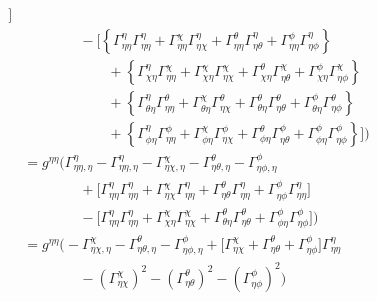 \documentclass[../main.tex]{subfiles}
\begin{document}
\begin{subequations}
\begin{align}
\begin{split}
            \Big] \\
            &\qquad\qquad - \Big[ \left\{ \Gamma^\eta_{\eta\eta} \Gamma^\eta_{\eta \eta} + \Gamma^\chi_{\eta\eta} \Gamma^\eta_{\eta \chi} + \Gamma^\theta_{\eta\eta} \Gamma^\eta_{\eta \theta} + \Gamma^\phi_{\eta\eta} \Gamma^\eta_{\eta \phi} \right\} \\
                &\qquad\qquad\qquad + \left\{ \Gamma^\eta_{\chi\eta} \Gamma^\chi_{\eta \eta} + \Gamma^\chi_{\chi\eta} \Gamma^\chi_{\eta \chi} + \Gamma^\theta_{\chi\eta} \Gamma^\chi_{\eta \theta} + \Gamma^\phi_{\chi\eta} \Gamma^\chi_{\eta \phi} \right\} \\
                &\qquad\qquad\qquad + \left\{ \Gamma^\eta_{\theta\eta} \Gamma^\theta_{\eta \eta} + \Gamma^\chi_{\theta\eta} \Gamma^\theta_{\eta \chi} + \Gamma^\theta_{\theta\eta} \Gamma^\theta_{\eta \theta} + \Gamma^\phi_{\theta\eta} \Gamma^\theta_{\eta \phi} \right\} \\
                &\qquad\qquad\qquad + \left\{ \Gamma^\eta_{\phi\eta} \Gamma^\phi_{\eta \eta} + \Gamma^\chi_{\phi\eta} \Gamma^\phi_{\eta \chi} + \Gamma^\theta_{\phi\eta} \Gamma^\phi_{\eta \theta} + \Gamma^\phi_{\phi\eta} \Gamma^\phi_{\eta \phi} \right\}
            \Big]
            \bigg) \\
        &= g^{\eta \eta} \bigg( \Gamma^\eta_{\eta\eta,\eta} - \Gamma^\eta_{\eta \eta,\eta} - \Gamma^\chi_{\eta \chi,\eta} - \Gamma^\theta_{\eta \theta,\eta} - \Gamma^\phi_{\eta \phi,\eta} \\
            &\qquad\qquad + \Big[ \Gamma^\eta_{\eta\eta} \Gamma^\eta_{\eta\eta} + \Gamma^\chi_{\eta\chi} \Gamma^\eta_{\eta\eta} + \Gamma^\theta_{\eta\theta} \Gamma^\eta_{\eta\eta} + \Gamma^\phi_{\eta\phi} \Gamma^\eta_{\eta\eta} \Big] \\
            &\qquad\qquad - \Big[ \Gamma^\eta_{\eta\eta} \Gamma^\eta_{\eta \eta} + \Gamma^\chi_{\chi\eta} \Gamma^\chi_{\eta \chi} + \Gamma^\theta_{\theta\eta} \Gamma^\theta_{\eta \theta} + \Gamma^\phi_{\phi\eta} \Gamma^\phi_{\eta \phi} \Big]
            \bigg) \\
        &= g^{\eta \eta} \bigg( - \Gamma^\chi_{\eta \chi,\eta} - \Gamma^\theta_{\eta \theta,\eta} - \Gamma^\phi_{\eta \phi,\eta} + \Big[ \Gamma^\chi_{\eta\chi} + \Gamma^\theta_{\eta\theta} + \Gamma^\phi_{\eta\phi} \Big] \Gamma^\eta_{\eta\eta} \\
            &\qquad\qquad - \left( \Gamma^\chi_{\eta\chi} \right)^2 - \left( \Gamma^\theta_{\eta\theta} \right)^2 - \left( \Gamma^\phi_{\eta \phi} \right)^2
            \bigg) \\

\end{split}
\end{align}
\end{subequations}
\end{document}
